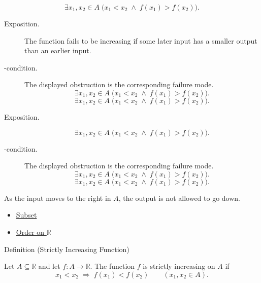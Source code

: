 \begin{remark*}
\[
  \exists x_1,x_2\in A\;\bigl(x_1<x_2\;\wedge\;f(x_1)>f(x_2)\bigr).
\]
\end{remark*}



\begin{remark*}
\begin{description}
  \item[Exposition.]
The function fails to be increasing if some later input has a smaller
output than an earlier input.


  \item[\exists-condition.]
  The displayed obstruction is the corresponding failure mode.
  \[
  \exists x_1,x_2\in A\;\bigl(x_1<x_2\;\wedge\;f(x_1)>f(x_2)\bigr).
\]
  \[
  \exists x_1,x_2\in A\;\bigl(x_1<x_2\;\wedge\;f(x_1)>f(x_2)\bigr).
\]
\end{description}
\end{remark*}

\begin{remark*}
\begin{description}
  \item[Exposition.]
\[
  \exists x_1,x_2\in A\;\bigl(x_1<x_2\;\wedge\;f(x_1)>f(x_2)\bigr).
\]


  \item[\exists-condition.]
  The displayed obstruction is the corresponding failure mode.
  \[
  \exists x_1,x_2\in A\;\bigl(x_1<x_2\;\wedge\;f(x_1)>f(x_2)\bigr).
\]
  \[
  \exists x_1,x_2\in A\;\bigl(x_1<x_2\;\wedge\;f(x_1)>f(x_2)\bigr).
\]
\end{description}
\end{remark*}

\begin{remark*}[Interpretation]
As the input moves to the right in $A$, the output is not allowed to go
down.
\end{remark*}

\begin{dependencies}
\begin{itemize}
  \item \hyperref[def:subset]{Subset}
  \item \hyperref[def:order-on-r]{Order on $\mathbb{R}$}
\end{itemize}
\end{dependencies}

\begin{definitionbox}{Definition (Strictly Increasing Function)}
\begin{definition}
\label{def:function-strictly-increasing}
Let $A\subseteq\mathbb{R}$ and let $f:A\to\mathbb{R}$.  The function
$f$ is strictly increasing on $A$ if
\[
  x_1<x_2\;\Longrightarrow\;f(x_1)<f(x_2)
  \qquad (x_1,x_2\in A).
\]
\end{definition}
\end{definitionbox}

